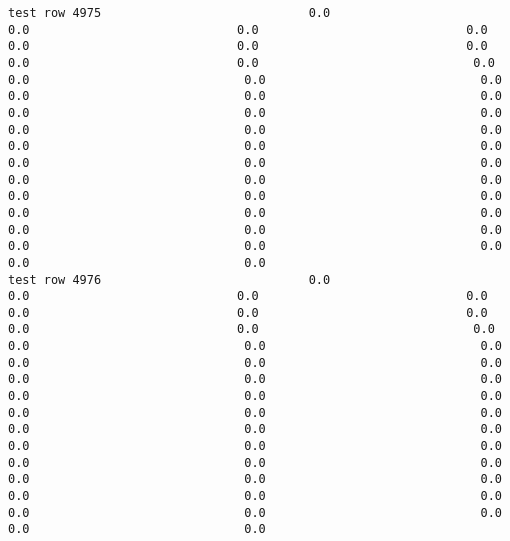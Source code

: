 \documentclass[11pt]{article}
\begin{document}
\begin{verbatim}
test row 4975                             0.0                             0.0                             0.0                             0.0                             0.0                             0.0                             0.0                             0.0                             0.0                              0.0                              0.0                              0.0                              0.0                              0.0                              0.0                              0.0                              0.0                              0.0                              0.0                              0.0                              0.0                              0.0                              0.0                              0.0                              0.0                              0.0                              0.0                              0.0                              0.0                              0.0                              0.0                              0.0                              0.0                              0.0                              0.0                              0.0                              0.0                              0.0                              0.0                              0.0                              0.0                              0.0                              0.0                              0.0                              0.0
test row 4976                             0.0                             0.0                             0.0                             0.0                             0.0                             0.0                             0.0                             0.0                             0.0                              0.0                              0.0                              0.0                              0.0                              0.0                              0.0                              0.0                              0.0                              0.0                              0.0                              0.0                              0.0                              0.0                              0.0                              0.0                              0.0                              0.0                              0.0                              0.0                              0.0                              0.0                              0.0                              0.0                              0.0                              0.0                              0.0                              0.0                              0.0                              0.0                              0.0                              0.0                              0.0                              0.0                              0.0                              0.0                              0.0

\end{verbatim}
\end{document}
